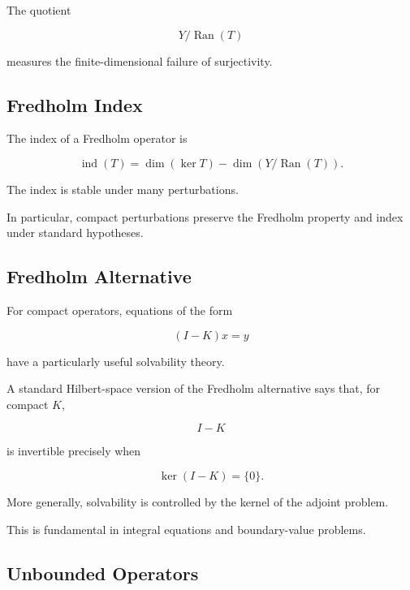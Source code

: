 The quotient

\[
Y/\operatorname{Ran}(T)
\]

measures the finite-dimensional failure of surjectivity.

\subsection{Fredholm Index}
\label{subsec:fredholm-index}

The index of a Fredholm operator is

\[
\boxed{
\operatorname{ind}(T)
=
\dim(\ker T)
-
\dim(Y/\operatorname{Ran}(T)).
}
\]

The index is stable under many perturbations.

In particular, compact perturbations preserve the Fredholm property and
index under standard hypotheses.

\subsection{Fredholm Alternative}
\label{subsec:fredholm-alternative}

For compact operators, equations of the form

\[
\boxed{
(I-K)x=y
}
\]

have a particularly useful solvability theory.

A standard Hilbert-space version of the Fredholm alternative says that,
for compact \(K\),

\[
I-K
\]

is invertible precisely when

\[
\boxed{
\ker(I-K)=\{0\}.
}
\]

More generally, solvability is controlled by the kernel of the adjoint
problem.

This is fundamental in integral equations and boundary-value problems.

\subsection{Unbounded Operators}
\label{subsec:unbounded-operators}

